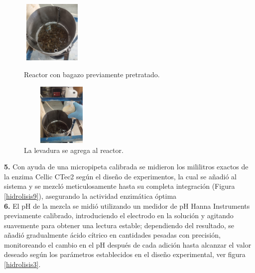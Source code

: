 \documentclass[12pt]{article}
\begin{document}
	      
	     \begin{figure}[H]
	     	\centering
	     	\begin{minipage}{0.46\textwidth}
	     		\centering
	     		\includegraphics[width=3cm, height=3cm]{imagenes/hidrolisis1} %
	     		\caption{ Reactor con bagazo previamente pretratado.}
	     		\label{ hidrolisis}
	     	\end{minipage}
	     	\hfill
	     	\begin{minipage}{0.48\textwidth}
	     		\centering
	     		\includegraphics[width=4cm, height=3cm]{imagenes/hidrolisis4 } %
	     		\caption{La levadura se agrega al reactor.}
	     		\label{hidrolisis4}
	     	\end{minipage}
	     \end{figure}
	     
	     
	     \textbf{5.} Con ayuda de una micropipeta calibrada se midieron los mililitros exactos de la enzima Cellic CTec2 según el diseño de experimentos, la cual se añadió al sistema y se mezcló meticulosamente hasta su completa integración (Figura \ref{hidrolisis9}), asegurando la actividad enzimática óptima	\\ 
	     	
	     	 
	     \textbf{6.} El pH de la mezcla se midió utilizando un medidor de pH Hanna Instruments previamente calibrado, introduciendo el electrodo en la solución y agitando suavemente para obtener una lectura estable; dependiendo del resultado, se añadió gradualmente ácido cítrico en cantidades pesadas con precisión, monitoreando el cambio en el pH después de cada adición hasta alcanzar el valor deseado según los parámetros establecidos en el diseño experimental, ver figura \ref{hidrolisis3}.
	     
	     
	     
\end{document}
